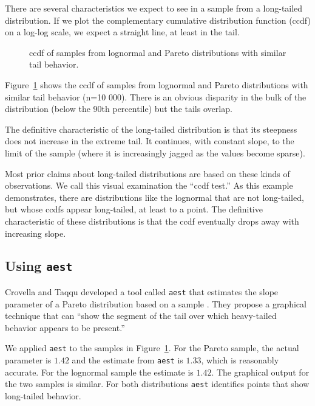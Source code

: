 \documentclass{elsart}
\begin{document}
There are several characteristics we expect to see in a sample
from a long-tailed distribution.  If we plot the complementary cumulative
distribution function (ccdf) on a log-log scale, we
expect a straight line, at least in the tail.

\begin{figure}[tb]
\centerline{}
\caption{ccdf of samples from lognormal and Pareto distributions
with similar tail behavior.}
\label{fig.sample}
\end{figure}

Figure~\ref{fig.sample} shows the ccdf of samples from
lognormal and Pareto distributions with similar tail behavior (n=10 000).
There is an obvious disparity in the bulk of the distribution
(below the 90th percentile) but the tails overlap.

The definitive characteristic of the long-tailed distribution is that
its steepness does not increase in the extreme tail.  It continues,
with constant slope, to the limit of the sample (where it is
increasingly jagged as the values become sparse).

Most prior claims about long-tailed distributions are based on these
kinds of observations.  We call this visual examination the
``ccdf test.''  As this example demonstrates, there are distributions
like the lognormal that are not long-tailed, but whose ccdfs appear
long-tailed, at least to a point.  The definitive characteristic of
these distributions is that the ccdf eventually drops away with
increasing slope.


\subsection {Using \texttt{aest}}

Crovella and Taqqu developed a tool called \texttt{aest} that
estimates the slope parameter of a Pareto distribution based on a
sample \cite{CrovellaTaqqu99}.  They propose a graphical technique
that can ``show the segment of the tail over which heavy-tailed
behavior appears to be present.''

We applied \texttt{aest} to the samples in Figure~\ref{fig.sample}.
For the Pareto sample, the actual parameter is $1.42$ and the
estimate from \texttt{aest} is $1.33$, which is reasonably accurate.
For the lognormal sample the estimate is $1.42$.
The graphical output for the two samples is similar.  For both
distributions \texttt{aest} identifies points that show long-tailed
behavior.  
\end{document}
